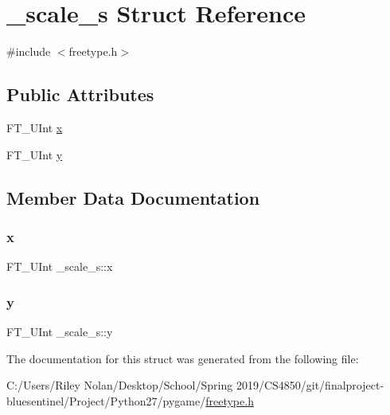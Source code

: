 \hypertarget{struct__scale__s}{}\section{\+\_\+scale\+\_\+s Struct Reference}
\label{struct__scale__s}


{\ttfamily \#include $<$freetype.\+h$>$}

\subsection*{Public Attributes}
\begin{DoxyCompactItemize}
\item 
F\+T\+\_\+\+U\+Int \mbox{\hyperlink{struct__scale__s_a739aeecb4bc54ee9c4398bd299e5ff0c}{x}}
\item 
F\+T\+\_\+\+U\+Int \mbox{\hyperlink{struct__scale__s_a4d80449f552e511ebce8cf3148413173}{y}}
\end{DoxyCompactItemize}


\subsection{Member Data Documentation}
\mbox{\label{struct__scale__s_a739aeecb4bc54ee9c4398bd299e5ff0c}} 
\subsubsection{\texorpdfstring{x}{x}}
{\footnotesize\ttfamily F\+T\+\_\+\+U\+Int \+\_\+scale\+\_\+s\+::x}

\mbox{\label{struct__scale__s_a4d80449f552e511ebce8cf3148413173}} 
\subsubsection{\texorpdfstring{y}{y}}
{\footnotesize\ttfamily F\+T\+\_\+\+U\+Int \+\_\+scale\+\_\+s\+::y}



The documentation for this struct was generated from the following file\+:\begin{DoxyCompactItemize}
\item 
C\+:/\+Users/\+Riley Nolan/\+Desktop/\+School/\+Spring 2019/\+C\+S4850/git/finalproject-\/bluesentinel/\+Project/\+Python27/pygame/\mbox{\hyperlink{freetype_8h}{freetype.\+h}}\end{DoxyCompactItemize}
